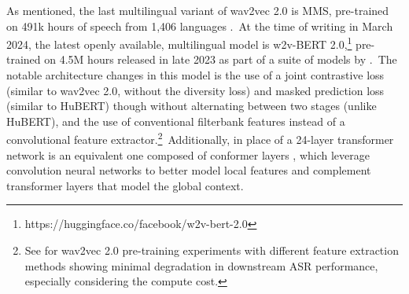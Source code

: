 \documentclass[main.tex]{subfiles}
\begin{document}
{As mentioned, the last multilingual variant of wav2vec 2.0 is MMS, pre-trained on 491k hours of speech from 1,406 languages \parencite{pratap2023scaling}.~At the time of writing in March 2024, the latest openly available, multilingual model is w2v-BERT 2.0,\footnote{https://huggingface.co/facebook/w2v-bert-2.0} pre-trained on 4.5M hours released in late 2023 as part of a suite of models by \textcite[][see §3.2.1]{barrault2023seamless}.~The notable architecture changes in this model is the use of a joint contrastive loss (similar to wav2vec 2.0, without the diversity loss) and masked prediction loss (similar to HuBERT) though without alternating between two stages (unlike HuBERT), and the use of conventional filterbank features instead of a convolutional feature extractor.\footnote{See \textcite{parcollet23_interspeech} for wav2vec 2.0 pre-training experiments with different feature extraction methods showing minimal degradation in downstream ASR performance, especially considering the compute cost.}~Additionally, in place of a 24-layer transformer network is an equivalent one composed of conformer layers \parencite{gulati2020conformer}, which leverage convolution neural networks to better model local features and complement transformer layers that model the global context.}
\end{document}
